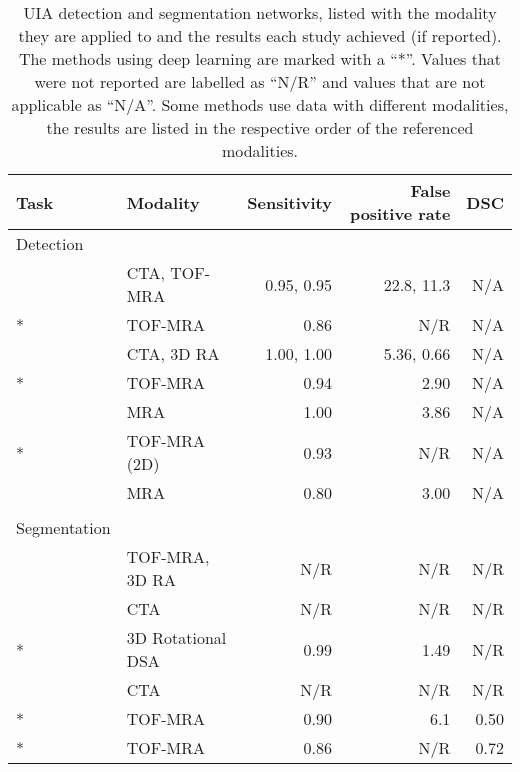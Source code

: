 \begin{table}[t]

	\centering
	\begin{tabular}{l l r r r}
		Task & Modality & Sensitivity & False positive rate & DSC \\
		\hline
		Detection & & & & \\
		\hspace{5mm}\citeauthor{Hentschke2014} & CTA, TOF-MRA & 0.95, 0.95 & 22.8, 11.3 & N/A \\
		\hspace{5mm}\citeauthor{Joo2020}* & TOF-MRA & 0.86 & N/R & N/A \\
		\hspace{5mm}\citeauthor{Lauric2010} & CTA, 3D RA & 1.00, 1.00 & 5.36, 0.66 & N/A \\
		\hspace{5mm}\citeauthor{Nakao2018}* & TOF-MRA & 0.94 & 2.90 & N/A \\
		\hspace{5mm}\citeauthor{Suniaga2012} & MRA & 1.00 & 3.86  & N/A \\
		\hspace{5mm}\citeauthor{Ueda2019}* & TOF-MRA (2D) & 0.93 & N/R & N/A \\
		\hspace{5mm}\citeauthor{Yang2011} & MRA & 0.80 & 3.00 & N/A \\		
		& & & & \\
		Segmentation & & & & \\
		\hspace{5mm}\citeauthor{Bogunovic2011} & TOF-MRA, 3D RA & N/R & N/R & N/R \\
		\hspace{5mm}\citeauthor{Firouzian2011} & CTA & N/R & N/R & N/R \\
		\hspace{5mm}\citeauthor{Liu2021}*  & 3D Rotational DSA & 0.99 & 1.49 & N/R \\
		\hspace{5mm}\citeauthor{Sen2013} & CTA & N/R & N/R & N/R \\
		\hspace{5mm}\citeauthor{Sichermann2019}* & TOF-MRA & 0.90 & 6.1 & 0.50 \\
		\hspace{5mm}\citeauthor{Yang2020}* & TOF-MRA & 0.86 & N/R & 0.72 \\

	\end{tabular}
	
	\caption[UIA detection and segmentation methods from literature.]{UIA detection and segmentation networks, listed with the modality they are applied to and the results each study achieved (if reported). The methods using deep learning are marked with a ``*''. Values that were not reported are labelled as ``N/R'' and values that are not applicable as ``N/A''. Some methods use data with different modalities, the results are listed in the respective order of the referenced modalities.}
	\label{table:related_work}
	
\end{table}








